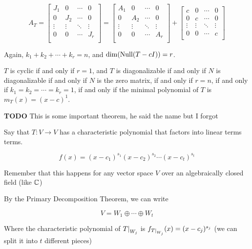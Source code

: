 \documentclass[12pt]{article}
\newcommand{\TODO}{\color{red}\textbf{TODO}\color{black}}
\begin{document}
  \[
    A_T = \begin{bmatrix}
      J_1 & 0 & \cdots & 0 \\
      0 & J_2 & \cdots & 0 \\
      \vdots & \vdots & \ddots & \vdots \\
      0 & 0 & \cdots & J_r \\
    \end{bmatrix}
    =
    \begin{bmatrix}
      A_1 & 0 & \cdots & 0 \\
      0 & A_2 & \cdots & 0 \\
      \vdots & \vdots & \ddots & \vdots \\
      0 & 0 & \cdots & A_r \\
    \end{bmatrix}
    +
    \begin{bmatrix}
      c & 0 & \cdots & 0 \\
      0 & c & \cdots & 0 \\
      \vdots & \vdots & \ddots & \vdots \\
      0 & 0 & \cdots & c \\
    \end{bmatrix}
  \]

  Again, $k_1 + k_2 + \cdots + k_r = n$, and $\dim(\mathrm{Null}(T - cI)) = r$.

  $T$ is cyclic if and only if $r = 1$, and $T$ is diagonalizable if and only if
  $N$ is diagonalizable if and only if $N$ is the zero matrix, if and only if $r
  = n$, if and only if $k_1 = k_2 = \cdots = k_r = 1$, if and only if the
  minimal polynomial of $T$ is $m_T(x) = (x - c)^1$.

  \TODO{} This is some important theorem, he said the name but I forgot

  Say that $T: V \to V$ has a characteristic polynomial that factors into linear
  terms terms. 

  \[
    f(x) = (x - c_1)^{s_1} (x - c_2)^{s_2} \cdots (x - c_t)^{s_t}
  \]

  Remember that this happens for any vector space $V$ over an algebraically
  closed field (like ${\mathbb C}$)

  By the Primary Decomposition Theorem, we can write

  \[
    V = W_1 \oplus \cdots \oplus W_t
  \]

  Where the characteristic polynomial of $\restr{T}{W_j}$ is
  $f_{\restr{T}{W_j}}(x) = (x - c_j)^{s_j}$ (we can split it into $t$ different
  pieces)
\end{document}
